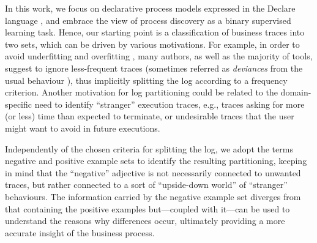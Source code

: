 \documentclass[a4wide,11pt]{article}
\newcommand{\tcolor}[2]{\color{#1}{#2}\color{black}}
\theoremstyle{definition}
\theoremstyle{plain}
\begin{document}
In this work, we focus on declarative process models expressed in the Declare language \cite{2008-Pesic}, and embrace the view of process discovery as a binary supervised learning task. Hence, our starting point is a classification of business traces into two sets, which can be driven by various motivations.
For example, in order to avoid underfitting and overfitting \cite{2010-Aalst}, many authors, as well as the majority of tools, suggest to ignore less-frequent traces (sometimes referred as \emph{deviances} from the usual behaviour \cite{2016-Nguyen}), thus implicitly splitting the log according to a frequency criterion. Another motivation for log partitioning could be related to the domain-specific need to identify ``stranger'' execution traces, e.g., traces asking for more (or less) time than expected to terminate, or undesirable traces that the user might want to avoid in future executions.


%
Independently of the chosen criteria for splitting the log, we adopt the terms negative and positive example sets to identify the resulting partitioning, keeping in mind that the ``negative'' adjective is not necessarily connected to unwanted traces, but rather connected to a sort of ``upside-down world'' of ``stranger'' behaviours. The information carried by the negative example set diverges from that containing the positive examples but---coupled with it---can be used to understand the reasons why differences occur, ultimately providing a more accurate insight of the business process. 
\end{document}
